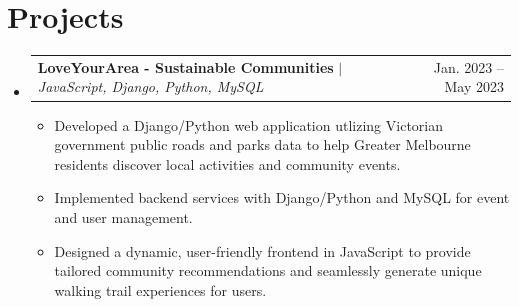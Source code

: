 \documentclass[letterpaper,11pt]{article}
\makeatletter
\newcommand{\resumeItem}[1]{\item\small{#1\vspace{-2pt}}}
\newcommand{\resumeProjectHeading}[2]{
    \item
    \begin{tabular*}{0.97\textwidth}{l@{\extracolsep{\fill}}r}
      \small#1 & #2 \\
    \end{tabular*}\vspace{-7pt}
}
\newcommand{\resumeSubHeadingListStart}{\begin{itemize}[leftmargin=0.15in, label={}]}
\newcommand{\resumeSubHeadingListEnd}{\end{itemize}}
\newcommand{\resumeItemListStart}{\begin{itemize}}
\newcommand{\resumeItemListEnd}{\end{itemize}\vspace{-5pt}}
\makeatother
\begin{document}
\section{Projects}
\resumeSubHeadingListStart

 \resumeProjectHeading
    {\textbf{LoveYourArea - Sustainable Communities} $|$ \emph{JavaScript, Django, Python, MySQL}}{Jan. 2023 -- May 2023}
    \resumeItemListStart
      \resumeItem{Developed a Django/Python web application utlizing Victorian government public roads and parks data to help Greater Melbourne residents discover local activities and community events.}
      \resumeItem{Implemented backend services with Django/Python and MySQL for event and user management.} 
      \resumeItem{Designed a dynamic, user-friendly frontend in JavaScript to provide tailored community recommendations and seamlessly generate unique walking trail experiences for users.}
    \resumeItemListEnd

\resumeSubHeadingListEnd
\end{document}
